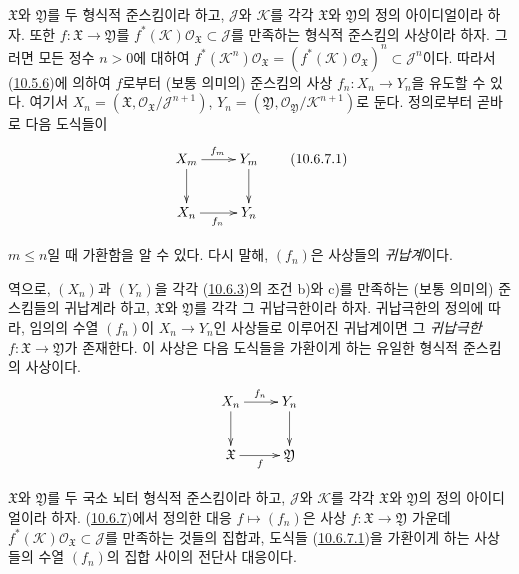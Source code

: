\begin{env}[10.6.7]
\label{I.10.6.7-ko}
$\mathfrak{X}$와 $\mathfrak{Y}$를 두 형식적 준스킴이라 하고,
$\mathscr{J}$와 $\mathscr{K}$를 각각 $\mathfrak{X}$와
$\mathfrak{Y}$의 정의 아이디얼이라 하자. 또한
$f:\mathfrak{X}\to\mathfrak{Y}$를
$f^*(\mathscr{K})\mathscr{O}_{\mathfrak{X}}\subset\mathscr{J}$를
만족하는 형식적 준스킴의 사상이라 하자. 그러면 모든 정수 $n>0$에 대하여
$f^*(\mathscr{K}^n)\mathscr{O}_{\mathfrak{X}}
=(f^*(\mathscr{K})\mathscr{O}_{\mathfrak{X}})^n
\subset\mathscr{J}^n$이다. 따라서
(\hyperref[I.10.5.6-ko]{10.5.6})에 의하여 $f$로부터 (보통 의미의)
준스킴의 사상 $f_n:X_n\to Y_n$을 유도할 수 있다. 여기서
$X_n=(\mathfrak{X},
\mathscr{O}_{\mathfrak{X}}/\mathscr{J}^{n+1})$,
$Y_n=(\mathfrak{Y},
\mathscr{O}_{\mathfrak{Y}}/\mathscr{K}^{n+1})$로 둔다. 정의로부터
곧바로 다음 도식들이
\[
  \label{I.10.6.7.1-ko}
  \xymatrix{
    X_m\ar[r]^{f_m}\ar[d] &
    Y_m\ar[d]\\
    X_n\ar[r]_{f_n} &
    Y_n
  }
  \tag{10.6.7.1}
\]


$m\leq n$일 때 가환함을 알 수 있다. 다시 말해, $(f_n)$은 사상들의
\emph{귀납계}이다.
\end{env}

\begin{env}[10.6.8]
\label{I.10.6.8-ko}
역으로, $(X_n)$과 $(Y_n)$을 각각
(\hyperref[I.10.6.3-ko]{10.6.3})의 조건 b)와 c)를 만족하는 (보통
의미의) 준스킴들의 귀납계라 하고, $\mathfrak{X}$와
$\mathfrak{Y}$를 각각 그 귀납극한이라 하자. 귀납극한의 정의에 따라,
임의의 수열 $(f_n)$이 $X_n\to Y_n$인 사상들로 이루어진 귀납계이면 그
\emph{귀납극한} $f:\mathfrak{X}\to\mathfrak{Y}$가 존재한다. 이 사상은
다음 도식들을 가환이게 하는 유일한 형식적 준스킴의 사상이다.
\[
  \xymatrix{
    X_n\ar[r]^{f_n}\ar[d] &
    Y_n\ar[d]\\
    \mathfrak{X}\ar[r]_f &
    \mathfrak{Y}
  }
\]
\end{env}

\begin{proposition}[10.6.9]
\label{I.10.6.9-ko}
$\mathfrak{X}$와 $\mathfrak{Y}$를 두 국소 뇌터 형식적 준스킴이라
하고, $\mathscr{J}$와 $\mathscr{K}$를 각각 $\mathfrak{X}$와
$\mathfrak{Y}$의 정의 아이디얼이라 하자.
(\hyperref[I.10.6.7-ko]{10.6.7})에서 정의한 대응
$f\mapsto(f_n)$은
사상 $f:\mathfrak{X}\to\mathfrak{Y}$ 가운데
$f^*(\mathscr{K})\mathscr{O}_{\mathfrak{X}}\subset\mathscr{J}$를
만족하는 것들의 집합과, 도식들
(\hyperref[I.10.6.7.1-ko]{10.6.7.1})을 가환이게 하는 사상들의 수열
$(f_n)$의 집합 사이의 전단사 대응이다.
\end{proposition}

